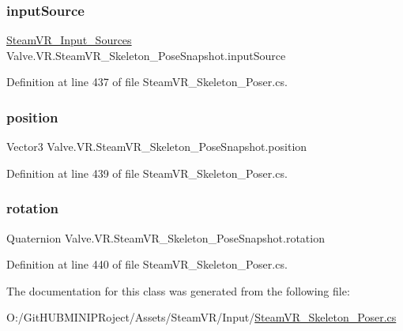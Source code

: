 \subsubsection{\texorpdfstring{inputSource}{inputSource}}
{\footnotesize\ttfamily \mbox{\hyperlink{namespace_valve_1_1_v_r_a82e5bf501cc3aa155444ee3f0662853f}{Steam\+V\+R\+\_\+\+Input\+\_\+\+Sources}} Valve.\+V\+R.\+Steam\+V\+R\+\_\+\+Skeleton\+\_\+\+Pose\+Snapshot.\+input\+Source}



Definition at line 437 of file Steam\+V\+R\+\_\+\+Skeleton\+\_\+\+Poser.\+cs.

\mbox{\label{class_valve_1_1_v_r_1_1_steam_v_r___skeleton___pose_snapshot_a91722317a4e8a3b7d195673b3182c791}} 
\subsubsection{\texorpdfstring{position}{position}}
{\footnotesize\ttfamily Vector3 Valve.\+V\+R.\+Steam\+V\+R\+\_\+\+Skeleton\+\_\+\+Pose\+Snapshot.\+position}



Definition at line 439 of file Steam\+V\+R\+\_\+\+Skeleton\+\_\+\+Poser.\+cs.

\mbox{\label{class_valve_1_1_v_r_1_1_steam_v_r___skeleton___pose_snapshot_af35f878f7dde9abce93c51736d937418}} 
\subsubsection{\texorpdfstring{rotation}{rotation}}
{\footnotesize\ttfamily Quaternion Valve.\+V\+R.\+Steam\+V\+R\+\_\+\+Skeleton\+\_\+\+Pose\+Snapshot.\+rotation}



Definition at line 440 of file Steam\+V\+R\+\_\+\+Skeleton\+\_\+\+Poser.\+cs.



The documentation for this class was generated from the following file\+:\begin{DoxyCompactItemize}
\item 
O\+:/\+Git\+H\+U\+B\+M\+I\+N\+I\+P\+Roject/\+Assets/\+Steam\+V\+R/\+Input/\mbox{\hyperlink{_steam_v_r___skeleton___poser_8cs}{Steam\+V\+R\+\_\+\+Skeleton\+\_\+\+Poser.\+cs}}\end{DoxyCompactItemize}
